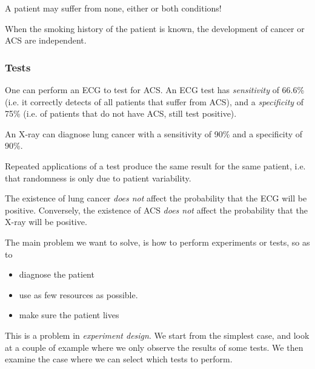\documentclass[twoside,a4paper]{article}
\begin{document}
\begin{assumption}
  A patient may suffer from none, either or both conditions!
\end{assumption}

\begin{assumption}
  When the smoking history of the patient is known, the development of cancer or ACS are independent.
\end{assumption}


\subsubsection{Tests}
One can perform an ECG to test for ACS. An ECG test has \emph{sensitivity} of 66.6\% (i.e. it correctly detects  of all patients that suffer from ACS), and a \emph{specificity} of 75\% (i.e.  of patients that do not have ACS, still test positive). 

An X-ray can diagnose lung cancer with a sensitivity of 90\% and a specificity of 90\%. 

\begin{assumption}
  Repeated applications of a test produce the same result for the same
  patient, i.e. that randomness is only due to patient variability.
\end{assumption}

\begin{assumption}
  The existence of lung cancer \emph{does not} affect the probability that the ECG will be positive. Conversely, the existence of ACS \emph{does not} affect the probability that the X-ray will be positive.
\end{assumption}


The main problem we want to solve, is how to perform experiments or
tests, so as to
\begin{itemize}
\item diagnose the patient
\item use as few resources as possible.
\item make sure the patient lives
\end{itemize}
This is a problem in \emph{experiment design}. We start from the simplest case, and look at a couple of example where we only observe the results of some tests.
We then examine the case where we can select which tests to perform.
\end{document}
